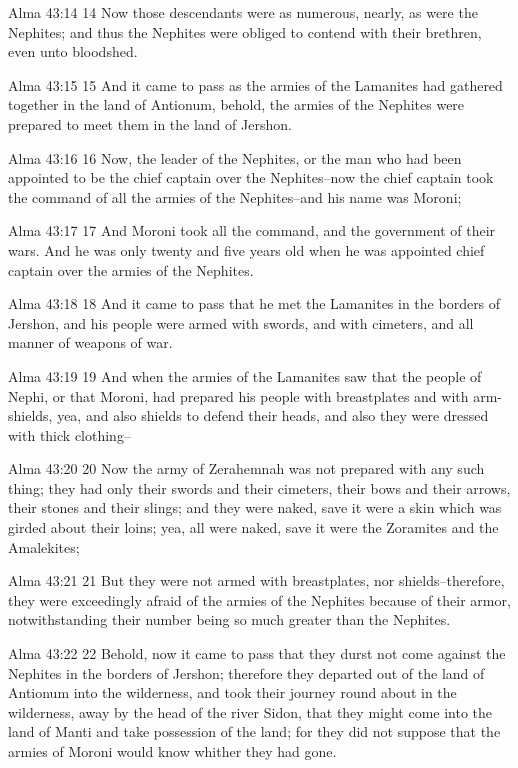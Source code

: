 Alma 43:14
 14 Now those descendants were as numerous, nearly, as were the
Nephites; and thus the Nephites were obliged to contend with
their brethren, even unto bloodshed.

Alma 43:15
 15 And it came to pass as the armies of the Lamanites had
gathered together in the land of Antionum, behold, the armies of
the Nephites were prepared to meet them in the land of Jershon.

Alma 43:16
 16 Now, the leader of the Nephites, or the man who had been
appointed to be the chief captain over the Nephites--now the
chief captain took the command of all the armies of the
Nephites--and his name was Moroni;

Alma 43:17
 17 And Moroni took all the command, and the government of their
wars. And he was only twenty and five years old when he was
appointed chief captain over the armies of the Nephites.

Alma 43:18
 18 And it came to pass that he met the Lamanites in the borders
of Jershon, and his people were armed with swords, and with
cimeters, and all manner of weapons of war.

Alma 43:19
 19 And when the armies of the Lamanites saw that the people of
Nephi, or that Moroni, had prepared his people with breastplates
and with arm-shields, yea, and also shields to defend their
heads, and also they were dressed with thick clothing--

Alma 43:20
 20 Now the army of Zerahemnah was not prepared with any such
thing; they had only their swords and their cimeters, their bows
and their arrows, their stones and their slings; and they were
naked, save it were a skin which was girded about their loins;
yea, all were naked, save it were the Zoramites and the
Amalekites;

Alma 43:21
 21 But they were not armed with breastplates, nor
shields--therefore, they were exceedingly afraid of the armies of
the Nephites because of their armor, notwithstanding their number
being so much greater than the Nephites.

Alma 43:22
 22 Behold, now it came to pass that they durst not come against
the Nephites in the borders of Jershon; therefore they departed
out of the land of Antionum into the wilderness, and took their
journey round about in the wilderness, away by the head of the
river Sidon, that they might come into the land of Manti and take
possession of the land; for they did not suppose that the armies
of Moroni would know whither they had gone.

